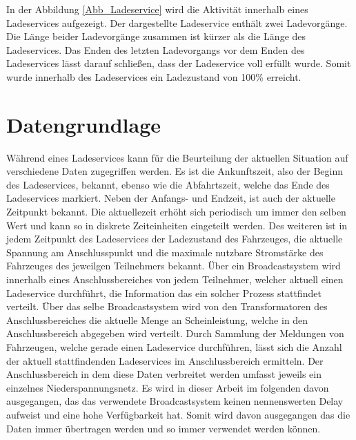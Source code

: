 In der Abbildung \ref{Abb_Ladeservice} wird die Aktivität innerhalb eines Ladeservices aufgezeigt. Der dargestellte Ladeservice enthält zwei Ladevorgänge. Die Länge beider Ladevorgänge zusammen ist kürzer als die Länge des Ladeservices. Das Enden des letzten Ladevorgangs vor dem Enden des Ladeservices lässt darauf schließen, dass der Ladeservice voll erfüllt wurde. Somit wurde innerhalb des Ladeservices ein Ladezustand von 100\% erreicht.
\section{Datengrundlage}
\label{cap:background_sec:setting}
Während eines Ladeservices kann für die Beurteilung der aktuellen Situation auf verschiedene Daten zugegriffen werden. Es ist die Ankunftszeit, also der Beginn des Ladeservices, bekannt, ebenso wie die Abfahrtszeit, welche das Ende des Ladeservices markiert. Neben der Anfangs- und Endzeit, ist auch der aktuelle Zeitpunkt bekannt. Die aktuellezeit erhöht sich periodisch um immer den selben Wert und kann so in diskrete Zeiteinheiten eingeteilt werden. Des weiteren ist in jedem Zeitpunkt des Ladeservices der Ladezustand des Fahrzeuges, die aktuelle Spannung am Anschlusspunkt und die maximale nutzbare Stromstärke des Fahrzeuges des jeweilgen Teilnehmers bekannt. Über ein Broadcastsystem wird innerhalb eines Anschlussbereiches von jedem Teilnehmer, welcher aktuell einen Ladeservice durchführt, die Information das ein solcher Prozess stattfindet verteilt. Über das selbe Broadcastsystem wird von den Transformatoren des Anschlussbereiches die aktuelle Menge an Scheinleistung, welche in den Anschlussbereich abgegeben wird verteilt. Durch Sammlung der Meldungen von Fahrzeugen, welche gerade einen Ladeservice durchführen, lässt sich die Anzahl der aktuell stattfindenden Ladeservices im Anschlussbereich ermitteln. Der Anschlussbereich in dem diese Daten verbreitet werden umfasst jeweils ein einzelnes Niederspannungsnetz.  Es wird in dieser Arbeit im folgenden davon ausgegangen, das das verwendete Broadcastsystem keinen nennenswerten Delay aufweist und eine hohe Verfügbarkeit hat. Somit wird davon ausgegangen das die Daten immer übertragen werden und so immer verwendet werden können.

